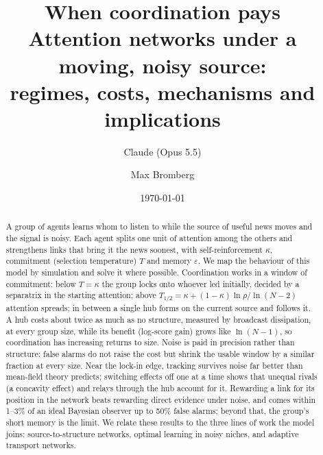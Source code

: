 \documentclass[11pt,a4paper]{article}
\title{\textbf{When coordination pays}\\[4pt]\large Attention networks under a moving, noisy source:\\regimes, costs, mechanisms and implications}
\author{Claude (Opus 5.5) \and Max Bromberg}
\date{\today}
\newcommand{\Thalf}{T_{1/2}}
\begin{document}
\maketitle
\begin{abstract}
\noindent
A group of agents learns whom to listen to while the source of useful news moves and the signal is noisy. Each agent
splits one unit of attention among the others and strengthens links that bring it the news soonest, with
self-reinforcement $\kappa$, commitment (selection temperature) $T$ and memory $\varepsilon$. We map the behaviour of
this model by simulation and solve it where possible. Coordination works in a window of commitment: below $T=\kappa$
the group locks onto whoever led initially, decided by a separatrix in the starting attention; above
$\Thalf=\kappa+(1-\kappa)\ln\rho/\ln(N-2)$ attention spreads; in between a single hub forms on the current source and
follows it. A hub costs about twice as much as no structure, measured by broadcast dissipation, at every group size,
while its benefit (log-score gain) grows like $\ln(N-1)$, so coordination has increasing returns to size. Noise is paid
in precision rather than structure: false alarms do not raise the cost but shrink the usable window by a similar fraction
at every size. Near the lock-in edge, tracking survives noise far better than mean-field theory predicts; switching
effects off one at a time shows that unequal rivals (a concavity effect) and relays through the hub account for it.
Rewarding a link for its position in the network beats rewarding direct evidence under noise, and comes within 1--3\%
of an ideal Bayesian observer up to 50\% false alarms; beyond that, the group's short memory is the limit. We relate
these results to the three lines of work the model joins: source-to-structure networks, optimal learning in noisy
niches, and adaptive transport networks.
\end{abstract}

\tableofcontents
\clearpage
















\appendix





\end{document}
